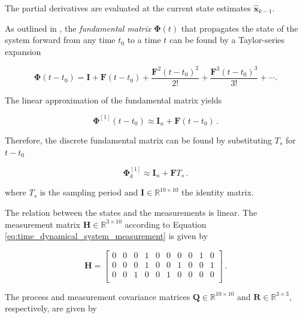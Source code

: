 \noindent
The partial derivatives are evaluated at the current state estimates $\hat{\mathbf{x}}_{k-1}$.

As outlined in \cite{zarchan2009fundamentals}, the \emph{fundamental matrix} $\bm{\Phi}(t)$ that propagates the state of the system forward from any time $t_0$ to a time $t$ can be found by a Taylor-series expansion 

\begin{equation}
  \bm{\Phi}(t-t_0) = \mathbf{I} + \mathbf{F} (t-t_0) + \frac{\mathbf{F}^2 (t-t_0)^2}{2!} +\frac{\mathbf{F}^{3} (t-t_0)^3}{3!} + \cdots.
\end{equation}
 
\noindent
The linear approximation of the fundamental matrix yields

\begin{equation}
  \bm{\Phi}^{[1]}(t-t_0) \approx \mathbf{I}_n + \mathbf{F} (t-t_0)\,.
\end{equation}

\noindent
Therefore, the discrete fundamental matrix can be found by substituting $T_s$ for $t-t_0$

\begin{equation}
  \bm{\Phi}^{[1]}_{k} \approx \mathbf{I}_{n} + \mathbf{F} T_s\,.
\end{equation}

\noindent
where $T_s$ is the sampling period and $\mathbf{I} \in \mathbb{R}^{10 \times 10}$ the identity matrix. 





The relation between the states and the measurements is linear. The measurement matrix $\mathbf{H} \in \mathbb{R}^{3 \times 10}$ according to Equation \ref{eq:time_dynamical_system_measurement} is given by 

\begin{equation}
\mathbf{H} = \begin{bmatrix}
  0 & 0 & 0 & 1 & 0 & 0 & 0 & 0 & 1 & 0\\
  0 & 0 & 0 & 1 & 0 & 0 & 1 & 0 & 0 & 1\\
  0 & 0 & 1 & 0 & 0 & 1 & 0 & 0 & 0 & 0\\
\end{bmatrix}\,.
\end{equation}

The process and measurement covariance matrices $\mathbf{Q} \in \mathbb{R}^{10 \times 10}$ and $\mathbf{R} \in \mathbb{R}^{3 \times 3}$, respectively, are given by

